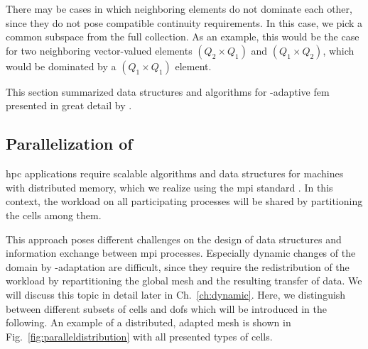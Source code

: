 There may be cases in which neighboring elements do not dominate each other, since they do not pose compatible continuity requirements. In this case, we pick a common subspace from the full collection. As an example, this would be the case for two neighboring vector-valued elements $(Q_2 \times Q_1)$ and $(Q_1 \times Q_2)$, which would be dominated by a $(Q_1 \times Q_1)$ element.

This section summarized data structures and algorithms for \hp-adaptive \gls{fem} presented in great detail by \textcite{bangerth2009}.





\subsection{Parallelization of }

\Gls{hpc} applications require scalable algorithms and data structures for machines with distributed memory, which we realize using the \gls{mpi} standard \textcite{mpi31}. In this context, the workload on all participating processes will be shared by partitioning the cells among them.

This approach poses different challenges on the design of data structures and information exchange between \gls{mpi} processes. Especially dynamic changes of the domain by \hp-adaptation are difficult, since they require the redistribution of the workload by repartitioning the global mesh and the resulting transfer of data. We will discuss this topic in detail later in Ch.~\ref{ch:dynamic}. Here, we distinguish between different subsets of cells and \glspl{dof} which will be introduced in the following. An example of a distributed, adapted mesh is shown in Fig.~\ref{fig:paralleldistribution} with all presented types of cells.

